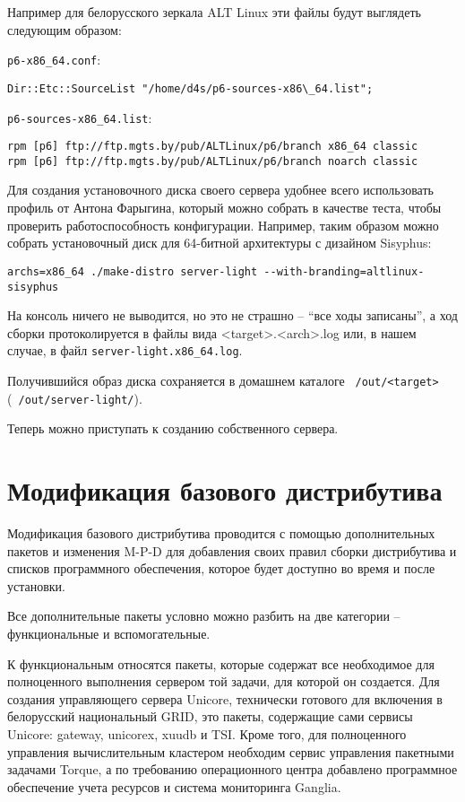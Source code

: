\documentclass[10pt, a5paper]{article}
\begin{document}
Например для белорусского зеркала ALT Linux эти файлы будут выглядеть следующим образом:

{\tt p6-x86\_64.conf}:
\begin{verbatim}
Dir::Etc::SourceList "/home/d4s/p6-sources-x86\_64.list";
\end{verbatim}

{\tt p6-sources-x86\_64.list}:
\begin{verbatim}
rpm [p6] ftp://ftp.mgts.by/pub/ALTLinux/p6/branch x86_64 classic
rpm [p6] ftp://ftp.mgts.by/pub/ALTLinux/p6/branch noarch classic
\end{verbatim}

Для создания установочного диска своего сервера удобнее всего использовать 
профиль от Антона Фарыгина, который можно собрать в качестве теста, 
чтобы проверить работоспособность конфигурации. 
Например, таким образом можно собрать установочный диск для 64-битной 
архитектуры с дизайном Sisyphus:
\begin{verbatim}
archs=x86_64 ./make-distro server-light --with-branding=altlinux-sisyphus
\end{verbatim}

На консоль ничего не выводится, но это не страшно -- ``все ходы записаны'', 
а ход сборки протоколируется в файлы вида <target>.<arch>.log или, в нашем 
случае, в файл {\tt server-light.x86\_64.log}.

Получившийся образ диска сохраняется в домашнем каталоге {\tt ~/out/<target>} ({\tt ~/out/server-light/}).

Теперь можно приступать к созданию собственного сервера.

\section*{Модификация базового дистрибутива}
Модификация базового дистрибутива проводится с помощью дополнительных пакетов 
и изменения M-P-D для добавления своих правил сборки дистрибутива и 
списков программного обеспечения, которое будет доступно во время и после установки.

Все дополнительные пакеты условно можно разбить на две категории -- функциональные и вспомогательные.

К функциональным относятся пакеты, которые содержат все необходимое для 
полноценного выполнения сервером той задачи, для которой он создается.
Для создания управляющего сервера Unicore, технически готового для включения 
в белорусский национальный GRID, это пакеты, содержащие сами сервисы Unicore: 
gateway, unicorex, xuudb и TSI. 
Кроме того, для полноценного управления вычислительным кластером необходим сервис 
управления пакетными задачами Torque, а по требованию операционного центра 
добавлено программное обеспечение учета ресурсов и система мониторинга Ganglia.
\end{document}
